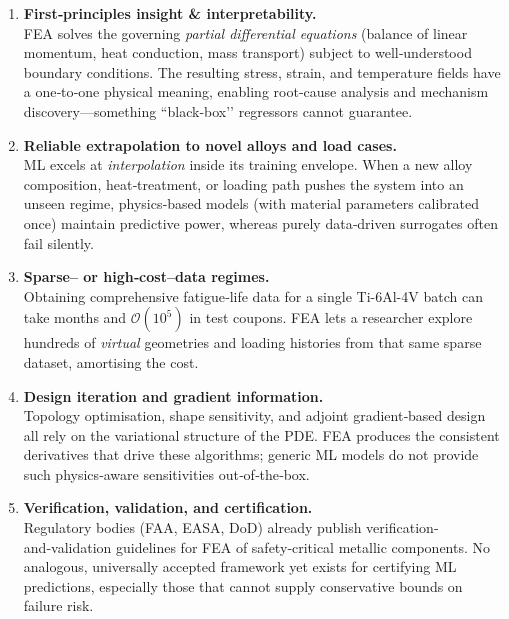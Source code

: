 \documentclass[12pt]{article}
\theoremstyle{definition} %
\theoremstyle{plain} %
\begin{document}
\begin{enumerate}
  \item \textbf{First‑principles insight \& interpretability.}\\
        FEA solves the governing \emph{partial differential equations}
        (balance of linear momentum, heat conduction, mass transport)
        subject to well‑understood boundary conditions.  
        The resulting stress, strain, and temperature fields have a
        one‑to‑one physical meaning, enabling root‑cause analysis
        and mechanism discovery—something ``black‑box’’ regressors
        cannot guarantee.

  \item \textbf{Reliable extrapolation to novel alloys and load cases.}\\
        ML excels at \emph{interpolation} inside its training envelope.
        When a new alloy composition, heat‑treatment, or loading path
        pushes the system into an unseen regime, physics‑based models
        (with material parameters calibrated once) maintain predictive
        power, whereas purely data‑driven surrogates often fail silently.

  \item \textbf{Sparse– or high‑cost–data regimes.}\\
        Obtaining comprehensive fatigue‑life data for a single
        Ti-6Al-4V batch can take months and $\mathcal{O}(10^5)$ in
        test coupons.
        FEA lets a researcher explore hundreds of \emph{virtual}
        geometries and loading histories from that same sparse dataset,
        amortising the cost.

  \item \textbf{Design iteration and gradient information.}\\
        Topology optimisation, shape sensitivity, and adjoint
        gradient‑based design all rely on the variational structure of
        the PDE.  
        FEA produces the consistent derivatives that drive these
        algorithms; generic ML models do not provide such physics‑aware
        sensitivities out‑of‑the‑box.

  \item \textbf{Verification, validation, and certification.}\\
        Regulatory bodies (FAA, EASA, DoD) already publish
        verification‐and‑validation guidelines for FEA of
        safety‑critical metallic components.
        No analogous, universally accepted framework yet exists for
        certifying ML predictions, especially those that cannot supply
        conservative bounds on failure risk.


\end{enumerate}
\end{document}
